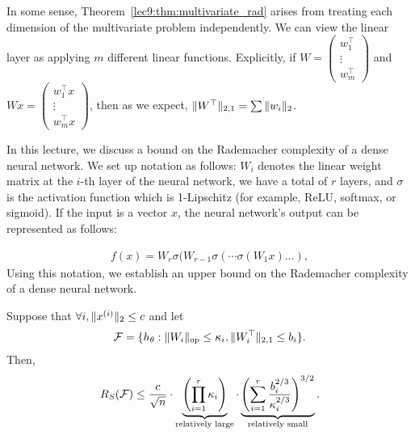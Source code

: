 \begin{remark}
    In some sense, Theorem~\ref{lec9:thm:multivariate_rad} arises from treating each dimension of the multivariate problem independently. We can view the linear layer as applying $m$ different linear functions. Explicitly, if $W = \begin{pmatrix} w_1^\top \\ \vdots \\ w_m^\top \end{pmatrix}$ and $Wx = \begin{pmatrix} w_1^\top x \\ \vdots \\ w_m^\top x \end{pmatrix}$, then as we expect, $\|W^\top\|_{2,1} = \sum \|w_i\|_2$.
\end{remark}


In this lecture, we discuss a bound on the Rademacher complexity of a dense neural network. We set up notation as follows: $W_i$ denotes the linear weight matrix at the $i$-th layer of the neural network, we have a total of $r$ layers, and $\sigma$ is the activation function which is 1-Lipschitz (for example, ReLU, softmax, or sigmoid). If the input is a vector $x$, the neural network's output can be represented as follows:

\begin{align}
    f(x) = W_r\sigma(W_{r-1}\sigma(\cdots \sigma(W_1x)\ldots),
\end{align}
Using this notation, we establish an upper bound on the Rademacher complexity of a dense neural network.

\begin{theorem}
\label{lec10:thm:dnn_rademacher}
Suppose that $\forall i, \|x^{(i)}\|_2 \leq c$ and let
\begin{align}
    \mathcal F = \{h_\theta : \|W_i\|_{\text{op}} \leq \kappa_i, \|W_i^\top\|_{2,1} \leq b_i\}.
\end{align}
Then,
\begin{equation}
    R_S (\mathcal F) \leq \frac{c}{\sqrt{n}} \cdot \underbrace{\left(\prod_{i=1}^r \kappa_i \right)}_{\text{relatively large}} \cdot \underbrace{\left( \sum_{i=1}^r\frac{b_i^{2/3}}{\kappa_i^{2/3}}\right)^{3/2}}_{\text{relatively small}}.
\end{equation}
\end{theorem}

